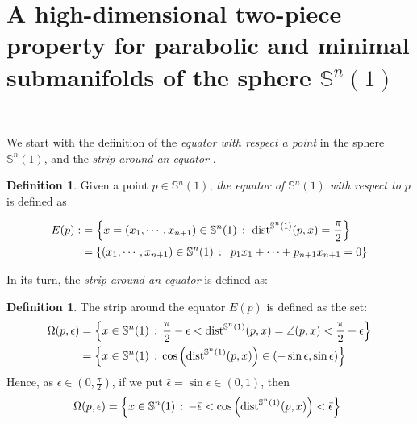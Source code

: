 \documentclass{amsart}
\theoremstyle{definition}
\newtheorem{definition}[theorem]{Definition}
\theoremstyle{remark}
\newcommand{\ese}{\mathbb{S}}
\begin{document}



\section{A high-dimensional two-piece property for parabolic and minimal submanifolds of the sphere $\mathbb{S}^n(1)$ }\


We start with the definition of the {\em equator with respect a point} in the sphere $\ese^n(1)$, and the {\em strip around an equator }.

\begin{definition}
Given a point $p \in \mathbb{S}^n(1)$, \emph{the equator of  $\mathbb{S}^n(1)$ with respect to $p$} is defined as 

  $$
    \begin{aligned}
E(p):&=\left\{x=(x_1,\cdots,x_{n+1})\in \mathbb{S}^n(1)\, :\,\,{\rm dist}^{\mathbb{S}^n(1)}(p,x)=\frac{\pi}{2} \right\}\\&=
\left\{(x_1,\cdots,x_{n+1})\in \mathbb{S}^n(1)\, : \,\,\, p_1x_1+\cdots+p_{n+1}x_{n+1}=0\right\}
\end{aligned}
    $$
    \end{definition}

    In its turn, the {\em strip around an equator } is defined as:

\begin{definition}
The strip around the equator $E(p)$ is defined as the set:
    $$
\begin{aligned}
\Omega(p,\epsilon)&=\left\lbrace x\in \mathbb{S}^{n}(1)\, : \, \frac{\pi}{2}-\epsilon<{\rm dist}^{\mathbb{S}^{n}(1)}(p,x)=\angle{(p,x)}<\frac{\pi}{2}+\epsilon\right\rbrace\\&=\left\lbrace x\in \mathbb{S}^{n}(1)\, : \,   \cos\left({\rm dist}^{\mathbb{S}^{n}(1)}(p,x)\right)\in ( -\sin\epsilon,\sin\epsilon) \right\rbrace
\end{aligned}
$$
Hence, as $\epsilon \in (0,\frac{\pi}{2})$, if we put $\bar \epsilon=\sin \epsilon \in (0,1)$, then
$$
\Omega(p,\epsilon) =\left\lbrace x\in \mathbb{S}^{n}(1)\, : \, -\bar \epsilon<\cos\left({\rm dist}^{\mathbb{S}^{n}(1)}(p,x)\right)<\bar \epsilon\right\rbrace.
$$
\end{definition}
\end{document}

